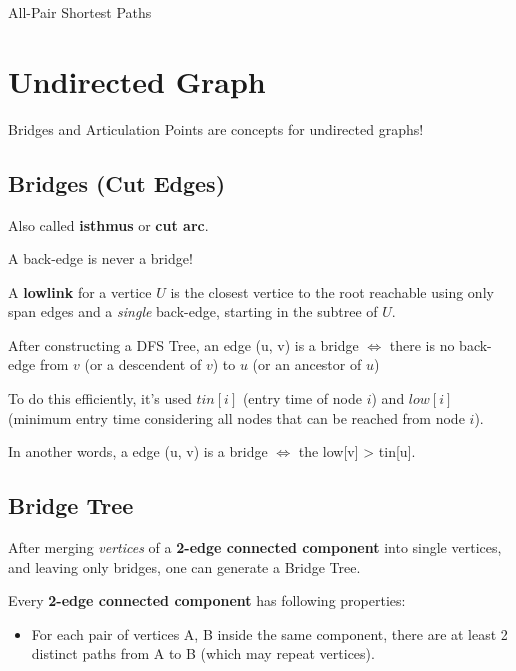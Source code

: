 	All-Pair Shortest Paths


\section{Undirected Graph}

	Bridges and Articulation Points are concepts for undirected graphs!
	
	\subsection{Bridges (Cut Edges)}

		Also called \textbf{isthmus} or \textbf{cut arc}.
		
		A back-edge is never a bridge!
		
		A \textbf{lowlink} for a vertice $U$ is the closest vertice to the root reachable using only span edges and a \textit{single} back-edge, starting in the subtree of $U$.
		
		After constructing a DFS Tree, an edge (u, v) is a bridge $\iff$ there is no back-edge from $v$ (or a descendent of $v$) to $u$ (or an ancestor of $u$)
		
		To do this efficiently, it's used $tin[i]$ (entry time of node $i$) and $low[i]$ (minimum entry time considering all nodes that can be reached from node $i$).
		
		In another words, a edge (u, v) is a bridge $\iff$ the low[v] > tin[u].


	\subsection{Bridge Tree}

	After merging \textit{vertices} of a \textbf{2-edge connected component} into single vertices, and leaving only bridges, one can generate a Bridge Tree.

	Every \textbf{2-edge connected component} has following properties:

    \begin{itemize}
		\item For each pair of vertices {A, B} inside the same component, there are at least 2 distinct paths from A to B (which may repeat vertices).
	\end{itemize}

	
